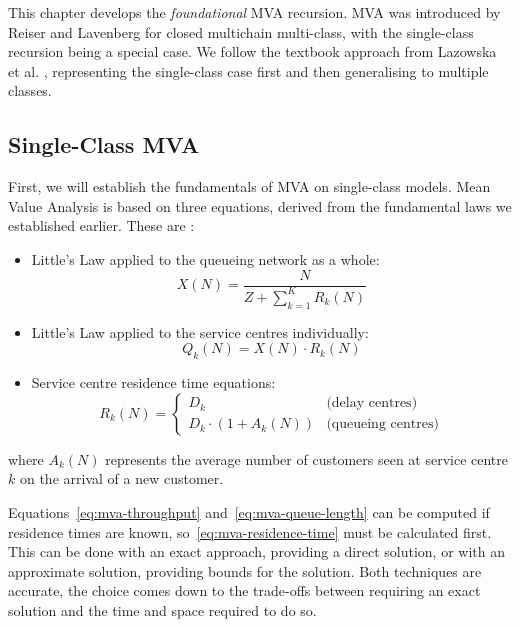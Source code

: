 This chapter develops the \textit{foundational} MVA recursion. MVA was introduced by Reiser and Lavenberg \cite{reiser80} for closed multichain multi-class, with the single-class recursion being a special case. We follow the textbook approach from Lazowska et al. \cite{lazowska84}, representing the single-class case first and then generalising to multiple classes. 


\subsection{Single-Class MVA}
\label{sec:bg-mva-single}

First, we will establish the fundamentals of MVA on single-class models. Mean Value Analysis is based on three equations, derived from the fundamental laws we established earlier. These are \cite{lazowska84}:

\begin{itemize}
\item Little's Law applied to the queueing network as a whole:
\begin{equation}
X(N) = \frac{N}{Z + \sum_{k=1}^{K} R_k(N)}
\label{eq:mva-throughput}
\end{equation}

\item Little's Law applied to the service centres individually:
\begin{equation}
Q_k(N) = X(N) \cdot R_k(N)
\label{eq:mva-queue-length}
\end{equation}

\item Service centre residence time equations:
\begin{equation}
R_k(N) = \begin{cases}
D_k & \text{(delay centres)} \\
D_k \cdot (1 + A_k(N)) & \text{(queueing centres)}
\end{cases}
\label{eq:mva-residence-time}
\end{equation}
\end{itemize} 

where $A_k(N)$ represents the average number of customers seen at service centre $k$ on the arrival of a new customer.

Equations~\eqref{eq:mva-throughput} and~\eqref{eq:mva-queue-length} can be computed if residence times are known, so~\eqref{eq:mva-residence-time} must be calculated first. This can be done with an exact approach, providing a direct solution, or with an approximate solution, providing bounds for the solution. Both techniques are accurate, the choice comes down to the trade-offs between requiring an exact solution and the time and space required to do so.

